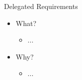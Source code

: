 \begin{Slide}{Delegated Requirements}
\begin{itemize}
\item What?
\begin{itemize}
\item ...
\end{itemize}
\item Why?
\begin{itemize}
\item ...

\end{itemize}
\end{itemize}
\end{Slide}
